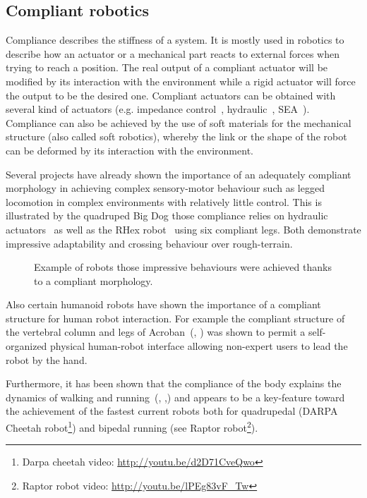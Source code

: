 \subsection{Compliant robotics} %
Compliance describes the stiffness of a system. It is mostly used in robotics to describe how an actuator or a mechanical part reacts to external forces when trying to reach a position. The real output of a compliant actuator will be modified by its interaction with the environment while a rigid actuator will force the output to be the desired one. Compliant actuators can be obtained with several kind of actuators (e.g. impedance control~\parencite{park2001impedance}, hydraulic~\parencite{alfayad2011high}, SEA~\parencite{pratt1995series}). Compliance can also be achieved by the use of soft materials for the mechanical structure (also called soft robotics), whereby the link or the shape of the robot can be deformed by its interaction with the environment.

Several projects have already shown the importance of an adequately compliant morphology in achieving complex sensory-motor behaviour such as legged locomotion in complex environments with relatively little control. This is illustrated by the quadruped Big Dog those compliance relies on hydraulic actuators~\parencite{raibert2008bigdog} as well as the RHex robot~\parencite{saranli2001rhex} using six compliant legs. Both demonstrate impressive adaptability and crossing behaviour over rough-terrain.

\begin{figure}[tb]
\centering
    \hfil
    \caption{Example of robots those impressive behaviours were achieved thanks to a compliant morphology.}
    \label{fig:compliant_robot}
\end{figure}

Also certain humanoid robots have shown the importance of a compliant structure for human robot interaction. For example the compliant structure of the vertebral column and legs of Acroban~(\cite{ly2011bio}, \cite{Oudeyer2011}) was shown to permit a self-organized physical human-robot interface allowing non-expert users to lead the robot by the hand.

Furthermore, it has been shown that the compliance of the body explains the dynamics of walking and running~(\cite{Geyer2006}, \cite{iida2007bipedal},) and appears to be a key-feature toward the achievement of the fastest current robots both for quadrupedal (DARPA Cheetah robot\footnote{Darpa cheetah video: \url{http://youtu.be/d2D71CveQwo}}) and bipedal running (see Raptor robot\footnote{Raptor robot video: \url{http://youtu.be/lPEg83vF_Tw}}).



